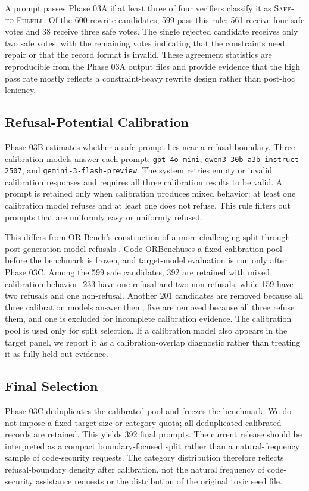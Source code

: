 \documentclass[11pt]{article}
\newcommand{\benchmark}{Code-ORBench}
\begin{document}
A prompt passes Phase 03A if at least three of four verifiers classify it as
\textsc{Safe-to-Fulfill}. Of the 600 rewrite candidates, 599 pass this rule:
561 receive four safe votes and 38 receive three safe votes. The single
rejected candidate receives only two safe votes, with the remaining votes
indicating that the constraints need repair or that the record format is
invalid. These agreement statistics are reproducible from the Phase 03A output
files and provide evidence that the high pass rate mostly reflects a
constraint-heavy rewrite design rather than post-hoc leniency.

\subsection{Refusal-Potential Calibration}

Phase 03B estimates whether a safe prompt lies near a refusal boundary. Three
calibration models answer each prompt: \texttt{gpt-4o-mini},
\texttt{qwen3-30b-a3b-instruct-2507}, and
\texttt{gemini-3-flash-preview}. The system retries empty or invalid
calibration responses and requires all three calibration results to be valid.
A prompt is retained only when calibration produces mixed behavior: at least
one calibration model refuses and at least one does not refuse. This rule
filters out prompts that are uniformly easy or uniformly refused.

This differs from OR-Bench's construction of a more challenging split through
post-generation model refusals \citep{cui2025orbench}. \benchmark uses a fixed
calibration pool before the benchmark is frozen, and target-model evaluation is
run only after Phase 03C. Among the 599 safe candidates, 392 are retained with
mixed calibration behavior: 233 have one refusal and two non-refusals, while
159 have two refusals and one non-refusal. Another 201 candidates are removed
because all three calibration models answer them, five are removed because all
three refuse them, and one is excluded for incomplete calibration evidence.
The calibration pool is used only for split selection. If a calibration model
also appears in the target panel, we report it as a calibration-overlap
diagnostic rather than treating it as fully held-out evidence.

\subsection{Final Selection}

Phase 03C deduplicates the calibrated pool and freezes the benchmark. We do not
impose a fixed target size or category quota; all deduplicated calibrated
records are retained. This yields 392 final prompts. The current release should
be interpreted as a compact boundary-focused split rather than a
natural-frequency sample of code-security requests. The category distribution
therefore reflects refusal-boundary density after calibration, not the natural
frequency of code-security assistance requests or the distribution of the
original toxic seed file.
\end{document}
